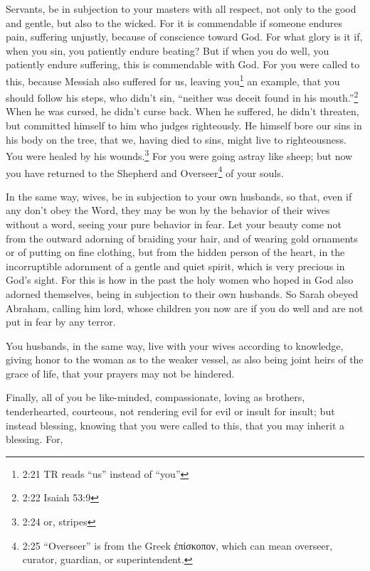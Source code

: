 \myverse{}Servants, be in subjection to your masters with all respect, not only to the good and gentle, but also to the wicked. \myverse{}For it is commendable if someone endures pain, suffering unjustly, because of conscience toward God. \myverse{}For what glory is it if, when you sin, you patiently endure beating? But if when you do well, you patiently endure suffering, this is commendable with God. \myverse{}For you were called to this, because Messiah also suffered for us, leaving you\footnote{2:21 TR reads “us” instead of “you”} an example, that you should follow his steps, \myverse{}who didn’t sin, “neither was deceit found in his mouth.”\footnote{2:22 Isaiah 53:9} \myverse{}When he was cursed, he didn’t curse back. When he suffered, he didn’t threaten, but committed himself to him who judges righteously. \myverse{}He himself bore our sins in his body on the tree, that we, having died to sins, might live to righteousness. You were healed by his wounds.\footnote{2:24 or, stripes} \myverse{}For you were going astray like sheep; but now you have returned to the Shepherd and Overseer\footnote{2:25 “Overseer” is from the Greek ἐπίσκοπον, which can mean overseer, curator, guardian, or superintendent.} of your souls.


\mychapter{} \myverse*{}In the same way, wives, be in subjection to your own husbands, so that, even if any don’t obey the Word, they may be won by the behavior of their wives without a word, \myverse{}seeing your pure behavior in fear. \myverse{}Let your beauty come not from the outward adorning of braiding your hair, and of wearing gold ornaments or of putting on fine clothing, \myverse{}but from the hidden person of the heart, in the incorruptible adornment of a gentle and quiet spirit, which is very precious in God’s sight. \myverse{}For this is how in the past the holy women who hoped in God also adorned themselves, being in subjection to their own husbands. \myverse{}So Sarah obeyed Abraham, calling him lord, whose children you now are if you do well and are not put in fear by any terror.


\myverse{}You husbands, in the same way, live with your wives according to knowledge, giving honor to the woman as to the weaker vessel, as also being joint heirs of the grace of life, that your prayers may not be hindered.


\myverse{}Finally, all of you be like-minded, compassionate, loving as brothers,
tenderhearted, courteous, \myverse{}not rendering evil for evil or insult for insult; but instead blessing, knowing that you were called to this, that you may inherit a blessing. \myverse{}For,

